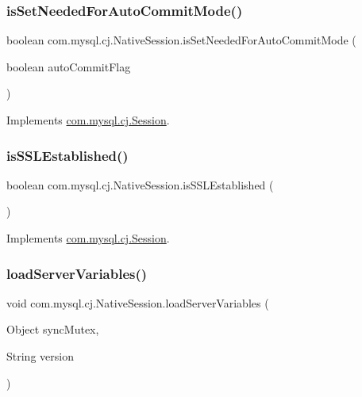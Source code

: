 \subsubsection{\texorpdfstring{is\+Set\+Needed\+For\+Auto\+Commit\+Mode()}{isSetNeededForAutoCommitMode()}}
{\footnotesize\ttfamily boolean com.\+mysql.\+cj.\+Native\+Session.\+is\+Set\+Needed\+For\+Auto\+Commit\+Mode (\begin{DoxyParamCaption}\item[{boolean}]{auto\+Commit\+Flag }\end{DoxyParamCaption})}



Implements \mbox{\hyperlink{interfacecom_1_1mysql_1_1cj_1_1_session_a3f747951ef258e5219237177aa3d4311}{com.\+mysql.\+cj.\+Session}}.

\mbox{\label{classcom_1_1mysql_1_1cj_1_1_native_session_a0cb179e160997c904bc69c9f4a027433}} 
\subsubsection{\texorpdfstring{is\+S\+S\+L\+Established()}{isSSLEstablished()}}
{\footnotesize\ttfamily boolean com.\+mysql.\+cj.\+Native\+Session.\+is\+S\+S\+L\+Established (\begin{DoxyParamCaption}{ }\end{DoxyParamCaption})}



Implements \mbox{\hyperlink{interfacecom_1_1mysql_1_1cj_1_1_session_a495638620a1d409d7da49b3cedf0e41d}{com.\+mysql.\+cj.\+Session}}.

\mbox{\label{classcom_1_1mysql_1_1cj_1_1_native_session_af9eebdf7b6270a82f07d2cb4c2566ca6}} 
\subsubsection{\texorpdfstring{load\+Server\+Variables()}{loadServerVariables()}}
{\footnotesize\ttfamily void com.\+mysql.\+cj.\+Native\+Session.\+load\+Server\+Variables (\begin{DoxyParamCaption}\item[{Object}]{sync\+Mutex,  }\item[{String}]{version }\end{DoxyParamCaption})}

